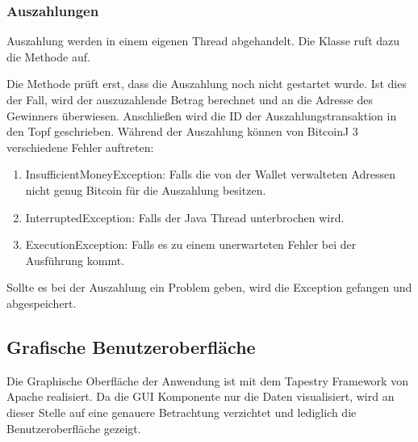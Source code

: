 \subsubsection{Auszahlungen}
Auszahlung werden in einem eigenen Thread abgehandelt. Die Klasse  ruft dazu die  Methode auf.

Die Methode prüft erst, dass die Auszahlung noch nicht gestartet wurde. Ist dies der Fall, wird der auszuzahlende Betrag berechnet und an die Adresse des Gewinners überwiesen. Anschließen wird die ID der Auszahlungstransaktion in den Topf geschrieben. Während der Auszahlung können von BitcoinJ 3 verschiedene Fehler auftreten:
\begin{enumerate}
\item InsufficientMoneyException: Falls die von der Wallet verwalteten Adressen nicht genug Bitcoin für die Auszahlung besitzen.
\item InterruptedException: Falls der Java Thread unterbrochen wird.
\item ExecutionException: Falls es zu einem unerwarteten Fehler bei der Ausführung kommt.
\end{enumerate}
Sollte es bei der Auszahlung ein Problem geben, wird die Exception gefangen und abgespeichert.

\subsection{Grafische Benutzeroberfläche}\label{ssec:btc_gui}

Die Graphische Oberfläche der Anwendung ist mit dem Tapestry Framework von Apache realisiert. Da die GUI Komponente nur die Daten visualisiert, wird an dieser Stelle auf eine genauere Betrachtung verzichtet und lediglich die Benutzeroberfläche gezeigt.


